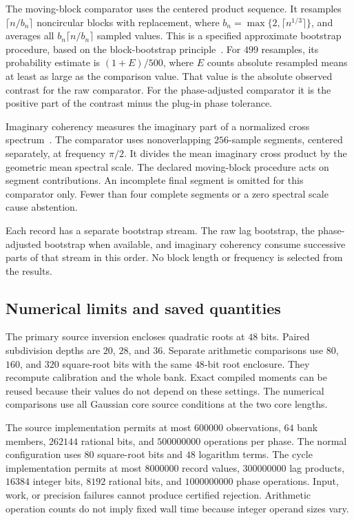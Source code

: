 The moving-block comparator uses the centered product sequence. It resamples $\lceil n/b_n\rceil$ noncircular blocks with replacement, where $b_n=\max\{2,\lceil n^{1/3}\rceil\}$, and averages all $b_n\lceil n/b_n\rceil$ sampled values. This is a specified approximate bootstrap procedure, based on the block-bootstrap principle~\cite{kunsch1989}. For $499$ resamples, its probability estimate is $(1+E)/500$, where $E$ counts absolute resampled means at least as large as the comparison value. That value is the absolute observed contrast for the raw comparator. For the phase-adjusted comparator it is the positive part of the contrast minus the plug-in phase tolerance.

Imaginary coherency measures the imaginary part of a normalized cross spectrum~\cite{noltecoherency2004}. The comparator uses nonoverlapping $256$-sample segments, centered separately, at frequency $\pi/2$. It divides the mean imaginary cross product by the geometric mean spectral scale. The declared moving-block procedure acts on segment contributions. An incomplete final segment is omitted for this comparator only. Fewer than four complete segments or a zero spectral scale cause abstention.

Each record has a separate bootstrap stream. The raw lag bootstrap, the phase-adjusted bootstrap when available, and imaginary coherency consume successive parts of that stream in this order. No block length or frequency is selected from the results.

\subsection{Numerical limits and saved quantities}
The primary source inversion encloses quadratic roots at $48$ bits. Paired subdivision depths are $20$, $28$, and $36$. Separate arithmetic comparisons use $80$, $160$, and $320$ square-root bits with the same $48$-bit root enclosure. They recompute calibration and the whole bank. Exact compiled moments can be reused because their values do not depend on these settings. The numerical comparisons use all Gaussian core source conditions at the two core lengths.

The source implementation permits at most $600000$ observations, $64$ bank members, $262144$ rational bits, and $500000000$ operations per phase. The normal configuration uses $80$ square-root bits and $48$ logarithm terms. The cycle implementation permits at most $8000000$ record values, $300000000$ lag products, $16384$ integer bits, $8192$ rational bits, and $1000000000$ phase operations. Input, work, or precision failures cannot produce certified rejection. Arithmetic operation counts do not imply fixed wall time because integer operand sizes vary.

